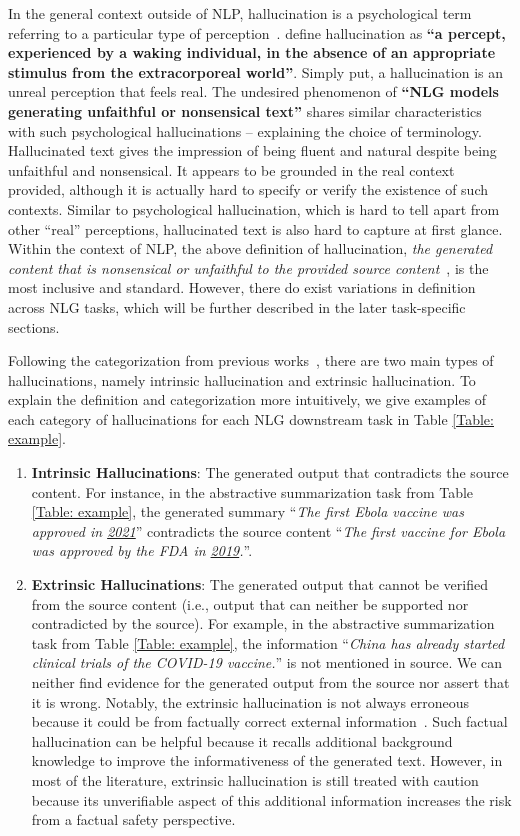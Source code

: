 \label{section:definition}
In the general context outside of NLP, hallucination is a psychological term referring to a particular type of perception~.  define hallucination as \textbf{``a percept, experienced by a waking individual, in the absence of an appropriate stimulus from the extracorporeal world''}.
Simply put, a hallucination is an unreal perception that feels real. 
The undesired phenomenon of \textbf{``NLG models generating unfaithful or nonsensical text''} shares similar characteristics with such psychological hallucinations -- explaining the choice of terminology. Hallucinated text gives the impression of being fluent and natural despite being unfaithful and nonsensical. It appears to be grounded in the real context provided, although it is actually hard to specify or verify the existence of such contexts. Similar to psychological hallucination, which is hard to tell apart from other ``real'' perceptions, hallucinated text is also hard to capture at first glance.
Within the context of NLP, the above definition of hallucination, \textit{the generated content that is nonsensical or unfaithful to the provided source content}~, is the most inclusive and standard.
However, there do exist variations in definition across NLG tasks, which will be further described in the later task-specific sections.

\label{subsec:category}
Following the categorization from previous works~, there are two main types of hallucinations, namely intrinsic hallucination and extrinsic hallucination.
To explain the definition and categorization more intuitively, we give examples of each category of hallucinations for each NLG downstream task in Table \ref{Table: example}.
\begin{enumerate}
\item \textbf{Intrinsic Hallucinations}: The generated output that contradicts the source content. 
For instance, in the abstractive summarization task from Table \ref{Table: example}, the generated summary ``\textit{The first Ebola vaccine was approved in \underline{2021}}'' contradicts the source content ``\textit{The first vaccine for Ebola was approved by the FDA in \underline{2019}.}''. 
\item \textbf{Extrinsic Hallucinations}: The generated output that cannot be verified from the source content (i.e., output that can neither be supported nor contradicted by the source). 
For example, in the abstractive summarization task from Table \ref{Table: example}, the information ``\textit{China has already started clinical trials of the COVID-19 vaccine.}'' is not mentioned in source. We can neither find evidence for the generated output from the source nor assert that it is wrong.
Notably, the extrinsic hallucination is not always erroneous because it could be from factually correct external information~. Such factual hallucination can be helpful because it recalls additional background knowledge to improve the informativeness of the generated text. 
However, in most of the literature, extrinsic hallucination is still treated with caution because its unverifiable aspect of this additional information increases the risk from a factual safety perspective. 
\end{enumerate}

